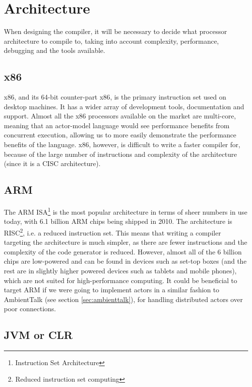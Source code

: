 \documentclass[11pt,a4paper]{report}
\begin{document}
\newpage
\section{Architecture}

When designing the compiler, it will be necessary to decide what processor architecture to compile to, taking into account complexity, performance, debugging and the tools available.

\subsection{x86}

x86, and its 64-bit counter-part x86\cite{intel-x86}, is the primary instruction set used on desktop machines.
It has a wider array of development tools, documentation and support.
Almost all the x86 processors available on the market are multi-core, meaning that an actor-model language would see performance benefits from concurrent execution, allowing us to more easily demonstrate the performance benefits of the language.
x86, however, is difficult to write a faster compiler for, because of the large number of instructions and complexity of the architecture (since it is a CISC architecture).

\subsection{ARM}

The ARM ISA\footnote{Instruction Set Architecture} is the most popular architecture in terms of sheer numbers in use today, with 6.1 billion ARM chips being shipped in 2010\cite{theregister2011}.
The architecture is RISC\footnote{Reduced instruction set computing}, i.e. a reduced instruction set.
This means that writing a compiler targeting the architecture is much simpler, as there are fewer instructions and the complexity of the code generator is reduced.
However, almost all of the 6 billion chips are low-powered and can be found in devices such as set-top boxes (and the rest are in slightly higher powered devices such as tablets and mobile phones), which are not suited for high-performance computing.
It could be beneficial to target ARM if we were going to implement actors in a similar fashion to AmbientTalk (see section \ref{sec:ambienttalk}), for handling distributed actors over poor connections.

\subsection{JVM or CLR}
\end{document}
